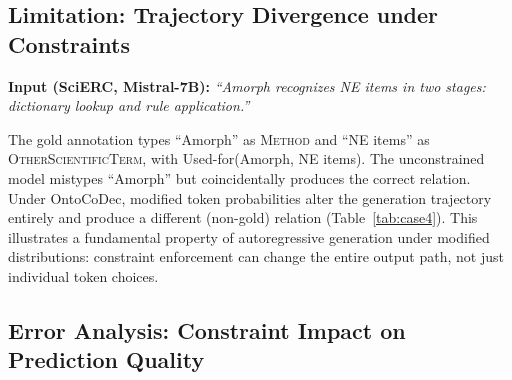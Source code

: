 \subsection{Limitation: Trajectory Divergence under Constraints}
\label{app:case-cf}

\noindent\textbf{Input (SciERC, Mistral-7B):} \textit{``Amorph recognizes NE items in two stages: dictionary lookup and rule application.''}

The gold annotation types ``Amorph'' as \textsc{Method} and ``NE items'' as \textsc{OtherScientificTerm}, with Used-for(Amorph, NE items). The unconstrained model mistypes ``Amorph'' but coincidentally produces the correct relation. Under OntoCoDec, modified token probabilities alter the generation trajectory entirely and produce a different (non-gold) relation (Table~\ref{tab:case4}). This illustrates a fundamental property of autoregressive generation under modified distributions: constraint enforcement can change the entire output path, not just individual token choices.

\begin{table}[h]
\centering
\small
\caption{Constrained decoding changes the generation trajectory. The unconstrained model coincidentally produced the gold triple despite type errors.}
\label{tab:case4}
\end{table}

\subsection{Error Analysis: Constraint Impact on Prediction Quality}
\label{app:error-analysis}

